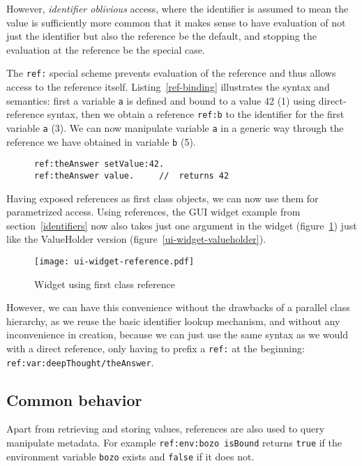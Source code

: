 \documentclass[preprint,authoryear]{llncs}
\begin{document}
However, \emph{identifier oblivious} access, where the identifier is assumed to mean the
value is sufficiently more common that it makes sense to have evaluation of not just
the identifier but also the reference be the default, and stopping the evaluation at the
reference be the special case.

The {\tt ref:} special scheme prevents evaluation of the reference and thus allows access
to the reference itself.  Listing~\ref{ref-binding} illustrates the syntax and semantics:
first a variable {\tt a} is defined and bound to a value 42 (1) using direct-reference syntax,
then we obtain a reference {\tt ref:b} to
the identifier for the first variable {\tt a} (3).  We can now manipulate variable {\tt a} 
in a generic way through the reference we have obtained in variable {\tt b} (5).  

\begin{figure}[htbp]
\begin{lstlisting}[style=numbers,label=ref-binding,caption=Accessing a variable via its reference.]
ref:theAnswer setValue:42.  
ref:theAnswer value.     //  returns 42
\end{lstlisting}
\end{figure}

Having exposed references as first class objects, we can now use them for parametrized 
access.   Using references, the GUI widget example from section~\ref{identifiers} now
also takes just one argument in the widget (figure~\ref{ui-widget-reference}) just like
the ValueHolder version (figure~\ref{ui-widget-valueholder}).

\begin{figure}[htbp]
\begin{center}
\texttt{[image: ui-widget-reference.pdf]}
\caption{Widget using first class reference}
\label{ui-widget-reference}
\end{center}
\end{figure}

However, we can have this convenience without the drawbacks of a parallel class
hierarchy, as we reuse the basic identifier lookup mechanism, and without any
inconvenience in creation, because we can just use the same syntax as we would
with a direct reference, only having to prefix a {\tt ref:} at the beginning:  {\tt ref:var:deepThought/theAnswer}.


\subsection{Common behavior}
\label{common-reference-behavior}
Apart from retrieving and storing values, references are also used to query manipulate
metadata.  For example {\tt ref:env:bozo isBound} returns {\tt true} if the environment
variable {\tt bozo} exists and {\tt false} if it does not.
\end{document}
